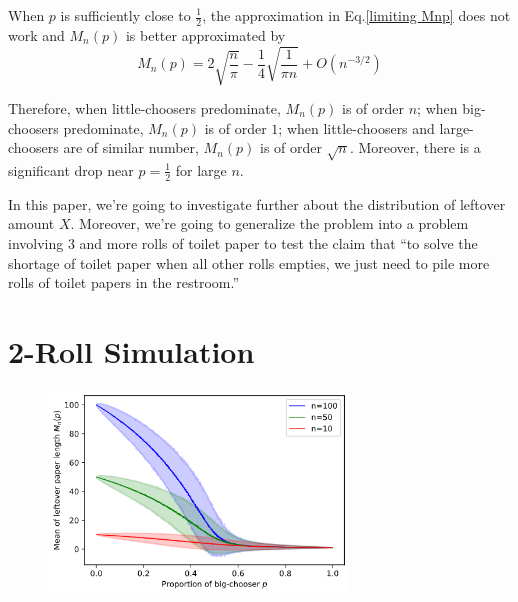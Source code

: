 \documentclass{article}
\begin{document}
When $p$ is sufficiently close to $\frac{1}{2}$, the approximation in Eq.\eqref{limiting Mnp} does not work and $M_n(p)$ is better approximated by 
\begin{equation}
    M_n(p)=
    2\sqrt{\frac{n}{\pi}} - \frac{1}{4} \sqrt{\frac{1}{\pi n}} + O(n^{-3/2})
\end{equation}

Therefore, when little-choosers predominate, $M_n(p)$ is of order $n$; when big-choosers predominate, $M_n(p)$ is of order $1$; when little-choosers and large-choosers are of similar number, $M_n(p)$ is of order $\sqrt{n}$. Moreover, there is a significant drop near $p=\frac{1}{2}$ for large $n$. 

In this paper, we're going to investigate further about the distribution of leftover amount $X$. Moreover, we're going to generalize the problem into a problem involving 3 and more rolls of toilet paper to test the claim that ``to solve the shortage of toilet paper when all other rolls empties, we just need to pile more rolls of toilet papers in the restroom.''
\section{2-Roll Simulation}
\begin{figure}[ht]
    \centering
    \includegraphics[width=8cm]{Mnp-2roll.png}
\end{figure}


\end{document}
